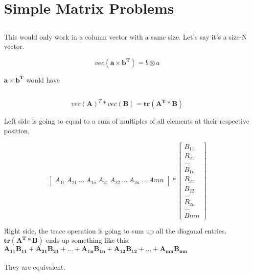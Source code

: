\documentclass{article}
\newcommand{\matr}[1]{\mathbf{#1}}
\begin{document}
\section{Simple Matrix Problems}
	\subsection{} %
	This would only work in a column vector with a same size. Let's say it's a size-N vector.

	\begin{equation*}
	vec(\matr{a} \times \matr{b^{T}}) = b \otimes a
	\end{equation*}

	$\matr{a} \times \matr{b^{T}}$ would have 

	\subsection{} %

	\begin{equation*}
	vec(\matr{A})^{T} * vec(\matr{B}) = \matr{tr(\matr{A^{T}}*\matr{B})} 
	\end{equation*}	
	
	Left side is going to equal to a sum of multiples of all elements at their respective position.

	\begin{equation*}
	\begin{bmatrix}
	A_{11} \ A_{21} \ ... \ A_{1n} \ A_{21} \ A_{22}  \ ... \ A_{2n} \ ... \ A{mn}
	\end{bmatrix}
	*
	\begin{bmatrix}
	B_{11} \\ B_{21} \\ ... \\ B_{1n} \\ B_{21} \\ B_{22}  \\ ... \\ B_{2n} \\ ... \\ B{mn}
	\end{bmatrix}
	\end{equation*}

	Right side, the trace operation is going to sum up all the diagonal entries. $\matr{tr(\matr{A^{T}}*\matr{B})}$
	ends up something like this:\\
	$\matr{A_{11}B_{11}} + \matr{A_{21}B_{21}} + ... + \matr{A_{1n}B_{1n}} + \matr{A_{12}B_{12}} + ... + \matr{A_{mn}B_{mn}}$\\
	\\
	They are equivalent.
\end{document}
